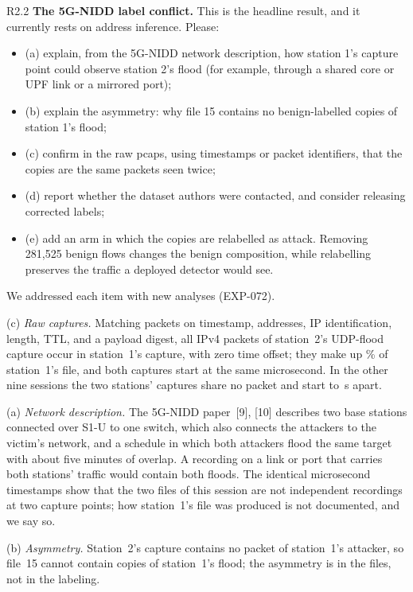 \label{rv:R2.2}
\begin{concern}{R2.2}
\textbf{The 5G-NIDD label conflict.} This is the headline result, and it currently rests on address inference. Please:
\begin{itemize}[leftmargin=*, itemsep=0pt]
\item (a) explain, from the 5G-NIDD network description, how station 1's capture point could observe station 2's flood (for example, through a shared core or UPF link or a mirrored port);
\item (b) explain the asymmetry: why file 15 contains no benign-labelled copies of station 1's flood;
\item (c) confirm in the raw pcaps, using timestamps or packet identifiers, that the copies are the same packets seen twice;
\item (d) report whether the dataset authors were contacted, and consider releasing corrected labels;
\item (e) add an arm in which the copies are relabelled as attack. Removing 281,525 benign flows changes the benign composition, while relabelling preserves the traffic a deployed detector would see.
\end{itemize}
\end{concern}
\response We addressed each item with new analyses (EXP-072).

(c) \emph{Raw captures.} Matching packets on timestamp, addresses, IP identification, length, TTL, and a payload digest, all \RPcapBSTwoPkts{} IPv4 packets of station~2's UDP-flood capture occur in station~1's capture, with zero time offset; they make up \RPcapShareBSOne\% of station~1's file, and both captures start at the same microsecond. In the other nine sessions the two stations' captures share no packet and start \RPcapStartMin{} to \RPcapStartMax{}\,s apart.

(a) \emph{Network description.} The 5G-NIDD paper~[9], [10] describes two base stations connected over S1-U to one switch, which also connects the attackers to the victim's network, and a schedule in which both attackers flood the same target with about five minutes of overlap. A recording on a link or port that carries both stations' traffic would contain both floods. The identical microsecond timestamps show that the two files of this session are not independent recordings at two capture points; how station~1's file was produced is not documented, and we say so.

(b) \emph{Asymmetry.} Station~2's capture contains no packet of station~1's attacker, so file~15 cannot contain copies of station~1's flood; the asymmetry is in the files, not in the labeling.

